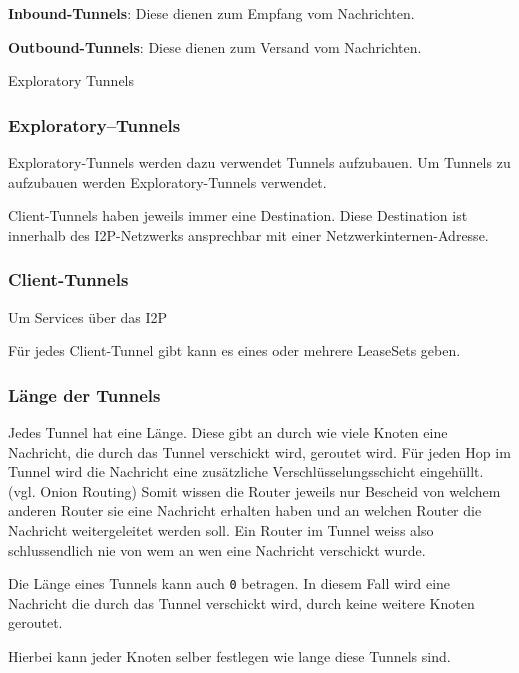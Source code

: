     \item \textbf{Inbound-Tunnels}: Diese dienen zum Empfang vom Nachrichten.
    \item \textbf{Outbound-Tunnels}: Diese dienen zum Versand vom Nachrichten.
    \item Exploratory Tunnels

\cite{noauthor_intro_nodate}

\subsubsection{Exploratory--Tunnels}

Exploratory-Tunnels werden dazu verwendet Tunnels aufzubauen.
Um Tunnels zu aufzubauen werden Exploratory-Tunnels verwendet.

Client-Tunnels haben jeweils immer eine Destination. Diese Destination ist innerhalb des I2P-Netzwerks ansprechbar mit einer Netzwerkinternen-Adresse.

\cite{de_boer_invisible_2019}

\subsubsection{Client-Tunnels}

Um Services über das I2P

Für jedes Client-Tunnel gibt kann es eines oder mehrere LeaseSets geben.



\subsubsection{Länge der Tunnels}

Jedes Tunnel hat eine Länge.
Diese gibt an durch wie viele Knoten eine Nachricht, die durch das Tunnel verschickt wird, geroutet wird.
Für jeden Hop im Tunnel wird die Nachricht eine zusätzliche Verschlüsselungsschicht eingehüllt. (vgl. Onion Routing)
Somit wissen die Router jeweils nur Bescheid von welchem anderen Router sie eine Nachricht erhalten haben und an welchen Router die Nachricht weitergeleitet werden soll.
Ein Router im Tunnel weiss also schlussendlich nie von wem an wen eine Nachricht verschickt wurde.

Die Länge eines Tunnels kann auch \lstinline|0| betragen.
In diesem Fall wird eine Nachricht die durch das Tunnel verschickt wird, durch keine weitere Knoten geroutet.

Hierbei kann jeder Knoten selber festlegen wie lange diese Tunnels sind.


